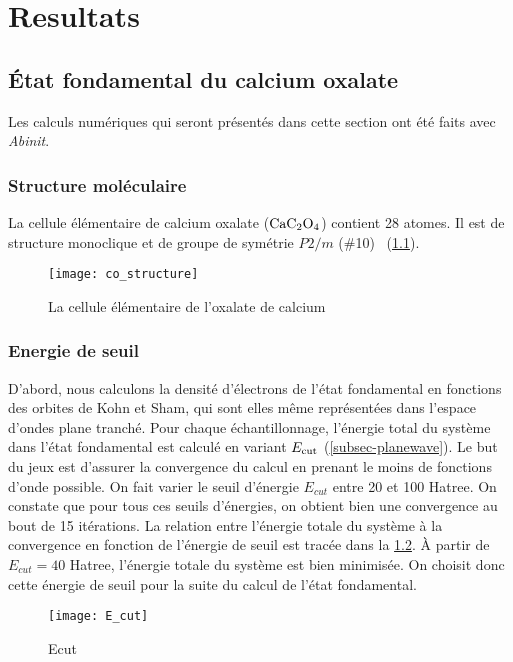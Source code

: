 \chapter{Resultats}
\label{chap-results}

\section{État fondamental du calcium oxalate}
Les calculs numériques qui seront présentés dans cette section ont été faits avec \textit{Abinit}.

\subsection{Structure moléculaire}
La cellule élémentaire de calcium oxalate ($\textnormal{Ca} \textnormal{C}_2 \textnormal{O}_4$) contient 28 atomes.
Il est de structure monoclique et de groupe de symétrie $P2/m$ ($\#$10)~\cite{Kolezynski2010} (\cref{BrillouinZone}).

\begin{figure}[!h]
  \centering
  \texttt{[image: co\_structure]}
  \caption{La cellule élémentaire de l'oxalate de calcium}\label{BrillouinZone}
\end{figure}

\subsection{Energie de seuil}
D'abord, nous calculons la densité d'électrons de l'état fondamental
en fonctions des orbites de Kohn et Sham,
qui sont elles même représentées dans l'espace d'ondes plane tranché.
Pour chaque échantillonnage, l'énergie total du système dans l'état fondamental est calculé
en variant $E_{\textnormal{cut}}$ (\cref{subsec-planewave}).
Le but du jeux est d'assurer la convergence du calcul en prenant le moins de fonctions d'onde possible.
On fait varier le seuil d'énergie $E_{cut}$ entre 20 et 100 Hatree.
On constate que pour tous ces seuils d'énergies, on obtient bien une convergence au bout de 15 itérations.
La relation entre l'énergie totale du système à la convergence
en fonction de l'énergie de seuil est tracée dans la \cref{fig-Ecut}.
À partir de $E_{cut} = 40$ Hatree, l'énergie totale du système est bien minimisée.
On choisit donc cette énergie de seuil pour la suite du calcul de l'état fondamental.

\begin{figure}[!h]
    \centering
    \texttt{[image: E\_cut]}
    \caption{Ecut}\label{fig-Ecut}
\end{figure}

